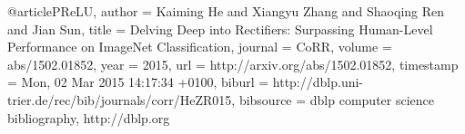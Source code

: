 {}


\begin{thebibliography}{9}

@article{PReLU,
  author    = {Kaiming He and
               Xiangyu Zhang and
               Shaoqing Ren and
               Jian Sun},
  title     = {Delving Deep into Rectifiers: Surpassing Human-Level Performance on
               ImageNet Classification},
  journal   = {CoRR},
  volume    = {abs/1502.01852},
  year      = {2015},
  url       = {http://arxiv.org/abs/1502.01852},
  timestamp = {Mon, 02 Mar 2015 14:17:34 +0100},
  biburl    = {http://dblp.uni-trier.de/rec/bib/journals/corr/HeZR015},
  bibsource = {dblp computer science bibliography, http://dblp.org}
}

\end{thebibliography}


